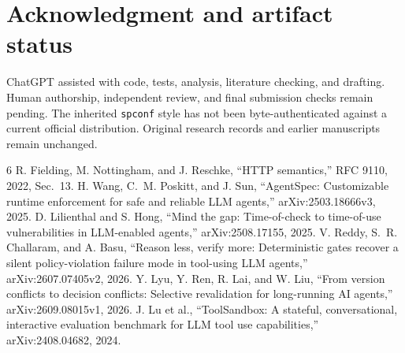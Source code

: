 \documentclass[10pt,letterpaper]{article}
\begin{document}
\section{Acknowledgment and artifact status}
ChatGPT assisted with code, tests, analysis, literature checking, and drafting. Human authorship, independent review, and final submission checks remain pending. The inherited \texttt{spconf} style has not been byte-authenticated against a current official distribution. Original research records and earlier manuscripts remain unchanged.

\begin{thebibliography}{6}
 R. Fielding, M. Nottingham, and J. Reschke, ``HTTP semantics,'' RFC 9110, 2022, Sec.~13.
 H. Wang, C.~M. Poskitt, and J. Sun, ``AgentSpec: Customizable runtime enforcement for safe and reliable LLM agents,'' arXiv:2503.18666v3, 2025.
 D. Lilienthal and S. Hong, ``Mind the gap: Time-of-check to time-of-use vulnerabilities in LLM-enabled agents,'' arXiv:2508.17155, 2025.
 V. Reddy, S.~R. Challaram, and A. Basu, ``Reason less, verify more: Deterministic gates recover a silent policy-violation failure mode in tool-using LLM agents,'' arXiv:2607.07405v2, 2026.
 Y. Lyu, Y. Ren, R. Lai, and W. Liu, ``From version conflicts to decision conflicts: Selective revalidation for long-running AI agents,'' arXiv:2609.08015v1, 2026.
 J. Lu et al., ``ToolSandbox: A stateful, conversational, interactive evaluation benchmark for LLM tool use capabilities,'' arXiv:2408.04682, 2024.
\end{thebibliography}
\end{document}
